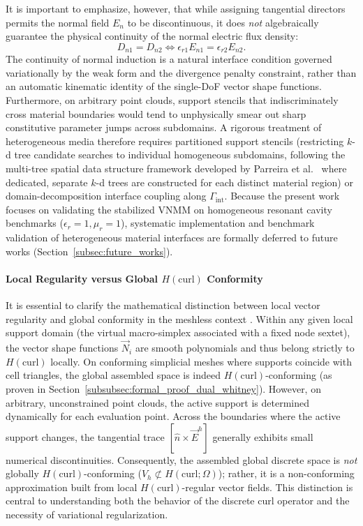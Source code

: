 \documentclass[preprint,12pt]{elsarticle}
\begin{document}
It is important to emphasize, however, that while assigning tangential directors permits the normal field $E_n$ to be discontinuous, it does \emph{not} algebraically guarantee the physical continuity of the normal electric flux density:
\begin{equation}
D_{n1} = D_{n2} \iff \epsilon_{r1} E_{n1} = \epsilon_{r2} E_{n2}.
\end{equation}
The continuity of normal induction is a natural interface condition governed variationally by the weak form and the divergence penalty constraint, rather than an automatic kinematic identity of the single-DoF vector shape functions. Furthermore, on arbitrary point clouds, support stencils that indiscriminately cross material boundaries would tend to unphysically smear out sharp constitutive parameter jumps across subdomains. A rigorous treatment of heterogeneous media therefore requires partitioned support stencils (restricting $k$-d tree candidate searches to individual homogeneous subdomains, following the multi-tree spatial data structure framework developed by Parreira et al.~\cite{parreira2006efficient} where dedicated, separate $k$-d trees are constructed for each distinct material region) or domain-decomposition interface coupling along $\Gamma_{\text{int}}$. Because the present work focuses on validating the stabilized VNMM on homogeneous resonant cavity benchmarks ($\epsilon_r = 1, \mu_r = 1$), systematic implementation and benchmark validation of heterogeneous material interfaces are formally deferred to future works (Section~\ref{subsec:future_works}).

\paragraph{Local Regularity versus Global $H(\mathrm{curl})$ Conformity}
It is essential to clarify the mathematical distinction between local vector regularity and global conformity in the meshless context \cite{monk2003finite, belytschko1994element}. Within any given local support domain (the virtual macro-simplex associated with a fixed node sextet), the vector shape functions $\vec{N}_i$ are smooth polynomials and thus belong strictly to $H(\mathrm{curl})$ locally. On conforming simplicial meshes where supports coincide with cell triangles, the global assembled space is indeed $H(\mathrm{curl})$-conforming (as proven in Section~\ref{subsubsec:formal_proof_dual_whitney}). However, on arbitrary, unconstrained point clouds, the active support is determined dynamically for each evaluation point. Across the boundaries where the active support changes, the tangential trace $[\hat{n} \times \vec{E}^h]$ generally exhibits small numerical discontinuities. Consequently, the assembled global discrete space is \emph{not} globally $H(\mathrm{curl})$-conforming ($V_h \not\subset H(\mathrm{curl}; \Omega)$); rather, it is a non-conforming approximation built from local $H(\mathrm{curl})$-regular vector fields. This distinction is central to understanding both the behavior of the discrete curl operator and the necessity of variational regularization.
\end{document}
